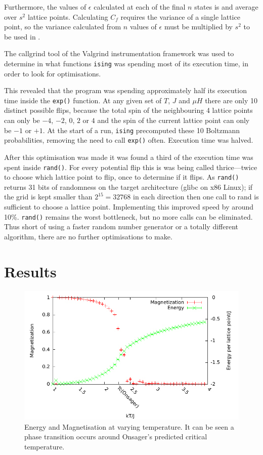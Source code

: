 \documentclass[12pt,a4paper,english]{article}
\begin{document}
Furthermore, the values of $\epsilon$ calculated at each of the final $n$ states is and average over $s^2$ lattice points.  Calculating $C_f$ requires the variance of a single lattice point, so the variance calculated from $n$ values of $\epsilon$ must be multiplied by $s^2$ to be used in .

\medskip

The callgrind tool of the Valgrind instrumentation framework \cite{valgrind} was used to determine in what functions \texttt{ising} was spending most of its execution time, in order to look for optimisations.

This revealed that the program was spending approximately half its execution time inside the \texttt{exp()} function. At any given set of $T$, $J$ and $\mu H$ there are only 10 distinct possible flips, because the total spin of the neighbouring 4 lattice points can only be $-4$, $-2$, $0$, $2$ or $4$ and the spin of the current lattice point can only be $-1$ or $+1$.  At the start of a run, \texttt{ising} precomputed these 10 Boltzmann probabilities, removing the need to call \texttt{exp()} often.  Execution time was halved.

After this optimisation was made it was found a third of the execution time was spent inside \texttt{rand()}. For every potential flip this is was being called thrice---twice to choose which lattice point to flip, once to determine if it flips.  As \texttt{rand()} returns 31 bits of randomness on the target architecture (glibc on x86 Linux); if the grid is kept smaller than $2^{15}=32768$ in each direction then one call to rand is sufficient to choose a lattice point.  Implementing this improved speed by around 10\%. \texttt{rand()} remains the worst bottleneck, but no more calls can be eliminated.  Thus short of using a faster random number generator or a totally different algorithm, there are no further optimisations to make.

\section{Results}
\label{sec:results}

\begin{figure}
\center
\includegraphics[width=\textwidth]{Optimized/tests/ising.pdf}
\caption{Energy and Magnetisation at varying temperature.  It can be seen a phase transition occurs around Onsager's predicted critical temperature.}\label{fig:ising}
\end{figure}
\end{document}
